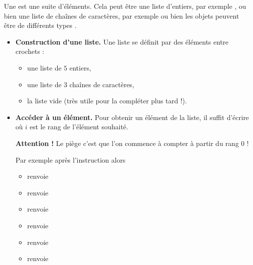 \documentclass[11pt,class=report,crop=false]{standalone}
\begin{document}
\newcommand{\badletter}[1]{\underline{\textcolor{red}{#1}}}






\begin{cours}[Liste (1)]

Une  est une suite d'éléments. Cela peut être une liste d'entiers, par exemple \ci{[5,-7,12,99]}, ou bien une liste de chaînes de caractères, par exemple  ou bien les objets peuvent être de différents types \ci{[3.14,"pi",10e-3,"x",True]}.

\begin{itemize}
  \item \textbf{Construction d'une liste.} Une liste se définit par des éléments entre crochets :
  \begin{itemize}
    \item {} une liste de $5$ entiers,
    \item {} une liste de $3$ chaînes de caractères,
    \item {} la liste vide (très utile pour la compléter plus tard  !).
  \end{itemize}

  \item \textbf{Accéder à un élément.} Pour obtenir un élément de la liste, il suffit d'écrire  où $i$ est le rang de l'élément souhaité. 
  
  \textbf{Attention !} Le piège c'est que l'on commence à compter à partir du rang $0$ ! 
  
  Par exemple après l'instruction  alors  
  \begin{itemize}
    \item {} renvoie 
    \item {} renvoie 
    \item {} renvoie 
    \item {} renvoie 
    \item {} renvoie 
    \item {} renvoie                    
  \end{itemize}  
  

\end{itemize}
\end{cours}
\end{document}
